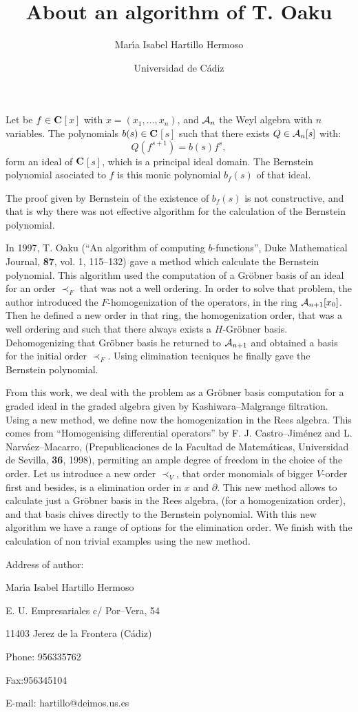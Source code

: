 \documentclass[11pt]{article}
\title{About an algorithm of T. Oaku}
\author{Mar\'{\i}a Isabel Hartillo Hermoso}
\date{Universidad de C\'adiz}
\def\CC{\bf C}
\begin{document}
\maketitle

Let be $f\in \CC$$ [x]$ with $x=(x_1,\ldots,x_n)$, and ${\cal A}_n$ the Weyl
algebra with $n$ variables.
The polynomials
$b(s)\in\CC$$ [s]$ such that there exists $Q\in{\cal A}_{n}[s]$ with:
$$
Q(f^{s+1})=b(s)f^s,
$$
form an ideal of $\CC $$[s]$, which is a principal ideal domain.
The Bernstein polynomial
asociated to $f$ is this monic polynomial $b_f(s)$ of that ideal.

The proof given by Bernstein of the existence of $b_f(s)$ is not constructive,
and that is why there was not effective algorithm for the calculation of the
Bernstein polynomial.

In 1997, T. Oaku (``An algorithm of computing $b$-functions'', Duke
Mathematical Journal, {\bf 87}, vol. 1, 115--132) gave a method which calculate
the Bernstein polynomial. This algorithm used the computation of a Gr\"obner
basis of an ideal for an order $\prec_F$ that was not a well ordering. In
order to solve that problem, 
the author introduced the $F$-homogenization of the
operators, in the ring ${\cal A}_{n+1}[x_0]$. Then he defined a new order in
that ring, the homogenization order, that was a well ordering and such that 
there always exists
a $H$-Gr\"obner basis. Dehomogenizing that Gr\"obner basis he
returned to ${\cal A}_{n+1}$ and obtained a basis for the initial order
$\prec_F$. Using elimination tecniques he finally gave the 
Bernstein polynomial.

From this work, we deal with the problem as  a Gr\"obner basis computation
for a graded ideal in the graded algebra given by
Kashiwara--Malgrange filtration. Using a new method, we define now the
homogenization in the Rees algebra. This comes from ``Homogenising
differential operators'' by F. J.
Castro--Jim\'enez and L. Narv\'aez--Macarro, (Prepublicaciones de la Facultad
de Matem\'aticas, Universidad de Sevilla, {\bf 36}, 1998), permiting an ample
degree of freedom in the choice of the order. Let us introduce a new order
$\prec_V$, that order monomials of bigger $V$-order first and besides, 
is a elimination order in $x$ and $\partial$. This new method allows to
calculate just a Gr\"obner basis in the Rees algebra, (for a homogenization
order), and that basis chives directly to the Bernstein polynomial. 
With this new
algorithm we have a range of options for the elimination order. We finish
with the calculation of non trivial examples using the new method.

\vspace{.5cm}

Address of author:

Mar\'{\i}a Isabel Hartillo Hermoso

E. U. Empresariales
c/ Por--Vera, 54 

11403 
Jerez de la Frontera
(C\'adiz)

Phone: 956335762

Fax:956345104

E-mail: hartillo@deimos.us.es
\end{document}
